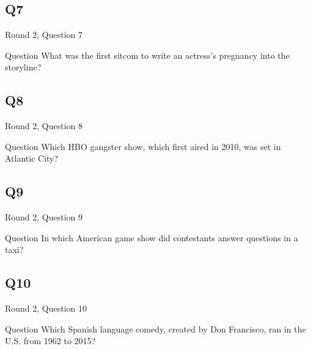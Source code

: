 \documentclass[11pt]{beamer}
\begin{document}
\subsection*{Q7}
\begin{frame}[t]{Round 2, Question 7}
\begin{block}{Question}
What was the first sitcom to write an actress's pregnancy into the storyline?
\end{block}
\end{frame}
\subsection*{Q8}
\begin{frame}[t]{Round 2, Question 8}
\begin{block}{Question}
Which HBO gangster show, which first aired in 2010, was set in Atlantic City?
\end{block}
\end{frame}
\subsection*{Q9}
\begin{frame}[t]{Round 2, Question 9}
\begin{block}{Question}
In which American game show did contestants answer questions in a taxi?
\end{block}
\end{frame}
\subsection*{Q10}
\begin{frame}[t]{Round 2, Question 10}
\begin{block}{Question}
Which Spanish language comedy, created by Don Francisco, ran in the U.S. from 1962 to 2015?
\end{block}
\end{frame}
\end{document}

